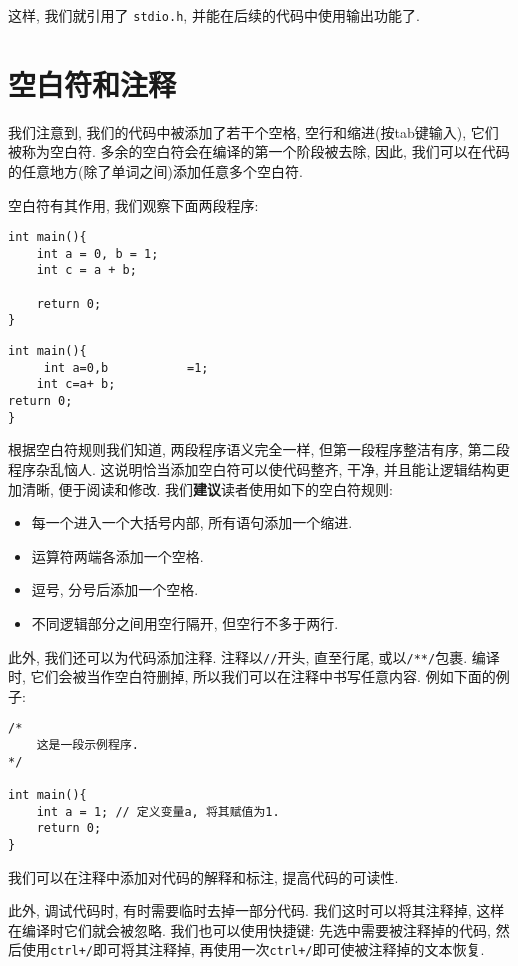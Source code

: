         这样, 我们就引用了 \texttt{stdio.h}, 并能在后续的代码中使用输出功能了.

    \section{空白符和注释} \label{空白符和注释}
        我们注意到, 我们的代码中被添加了若干个空格, 空行和缩进(按tab键输入), 它们被称为空白符. 多余的空白符会在编译的第一个阶段被去除, 因此, 我们可以在代码的任意地方(除了单词之间)添加任意多个空白符.

        空白符有其作用, 我们观察下面两段程序:
\begin{lstlisting}
int main(){
    int a = 0, b = 1;
    int c = a + b;

    return 0;
}
\end{lstlisting}

\begin{lstlisting}
int main(){
     int a=0,b           =1;
    int c=a+ b;
return 0;
}
\end{lstlisting}

        根据空白符规则我们知道, 两段程序语义完全一样, 但第一段程序整洁有序, 第二段程序杂乱恼人. 这说明恰当添加空白符可以使代码整齐, 干净, 并且能让逻辑结构更加清晰, 便于阅读和修改. 我们\textbf{建议}读者使用如下的空白符规则:
        \begin{itemize}
            \item 每一个进入一个大括号内部, 所有语句添加一个缩进.
            \item 运算符两端各添加一个空格.
            \item 逗号, 分号后添加一个空格.
            \item 不同逻辑部分之间用空行隔开, 但空行不多于两行.
        \end{itemize}

        此外, 我们还可以为代码添加注释. 注释以\texttt{//}开头, 直至行尾, 或以\texttt{/**/}包裹. 编译时, 它们会被当作空白符删掉, 所以我们可以在注释中书写任意内容. 例如下面的例子:
\begin{lstlisting}
/*
    这是一段示例程序.
*/

int main(){
    int a = 1; // 定义变量a, 将其赋值为1.
    return 0;
}
\end{lstlisting}

        我们可以在注释中添加对代码的解释和标注, 提高代码的可读性.

        此外, 调试代码时, 有时需要临时去掉一部分代码. 我们这时可以将其注释掉, 这样在编译时它们就会被忽略. 我们也可以使用快捷键: 先选中需要被注释掉的代码, 然后使用\texttt{ctrl+/}即可将其注释掉, 再使用一次\texttt{ctrl+/}即可使被注释掉的文本恢复.

